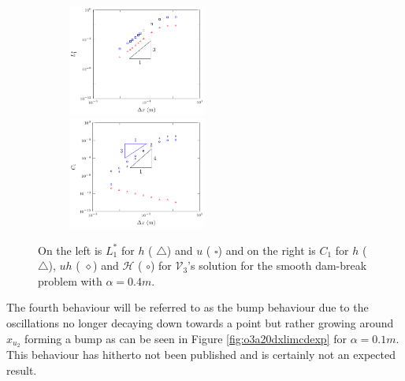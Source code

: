 \documentclass[SingleSpace,12pt,Journal]{Serre_ASCE}
\begin{document}
\begin{figure}
	\centering
	\begin{subfigure}{\textwidth}
		\includegraphics[width=0.5\textwidth]{pics/results/SDB/Lcon/alpha2.5/1.pdf}
		\includegraphics[width=0.5\textwidth]{pics/results/SDB/Con/9.pdf}
	\end{subfigure}
	\caption{On the left is $L^*_1$ for $h$ ({\color{red} $\triangle$}) and $u$ ({\color{blue} $\square$}) and on the right is $C_1$ for $h$ ({\color{red} $\triangle$}), $uh$ ({\color{black} $\diamond$}) and $\mathcal{H}$ ({\color{blue} $\circ$}) for $\mathcal{V}_3$'s solution for the smooth dam-break problem with $\alpha = 0.4m$.}
	\label{fig:o3a3dxlimmeasure}
\end{figure}


The fourth behaviour will be referred to as the bump behaviour due to the oscillations no longer decaying down towards a point but rather growing around $x_{u_2}$ forming a bump as can be seen in Figure \ref{fig:o3a20dxlimcdexp} for $\alpha = 0.1m$. This behaviour has hitherto not been published and is certainly not an expected result. 
\end{document}
